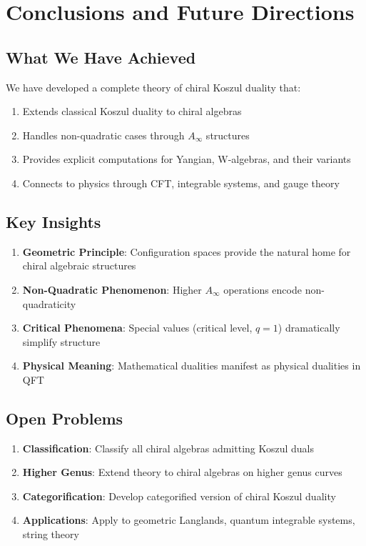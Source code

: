 \section{Conclusions and Future Directions}

\subsection{What We Have Achieved}

We have developed a complete theory of chiral Koszul duality that:
\begin{enumerate}
\item Extends classical Koszul duality to chiral algebras
\item Handles non-quadratic cases through $A_\infty$ structures
\item Provides explicit computations for Yangian, W-algebras, and their variants
\item Connects to physics through CFT, integrable systems, and gauge theory
\end{enumerate}

\subsection{Key Insights}

\begin{enumerate}
\item \textbf{Geometric Principle}: Configuration spaces provide the natural home for chiral algebraic structures
\item \textbf{Non-Quadratic Phenomenon}: Higher $A_\infty$ operations encode non-quadraticity
\item \textbf{Critical Phenomena}: Special values (critical level, $q=1$) dramatically simplify structure
\item \textbf{Physical Meaning}: Mathematical dualities manifest as physical dualities in QFT
\end{enumerate}

\subsection{Open Problems}

\begin{enumerate}
\item \textbf{Classification}: Classify all chiral algebras admitting Koszul duals
\item \textbf{Higher Genus}: Extend theory to chiral algebras on higher genus curves
\item \textbf{Categorification}: Develop categorified version of chiral Koszul duality
\item \textbf{Applications}: Apply to geometric Langlands, quantum integrable systems, string theory
\end{enumerate}